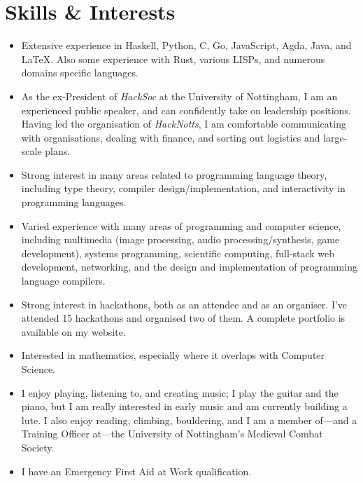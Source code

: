 \documentclass[12pt]{article}
\begin{document}
\section*{Skills \& Interests}
\begin{itemize}
	\item Extensive experience in Haskell, Python, C, Go, JavaScript, Agda, Java, and \LaTeX. Also some experience with Rust, various LISPs, and numerous domains specific languages.
	\item As the ex-President of \textit{HackSoc} at the University of Nottingham, I am an experienced public speaker, and can confidently take on leadership positions. Having led the organisation of \textit{HackNotts}, I am comfortable communicating with organisations, dealing with finance, and sorting out logistics and large-scale plans.
	\item Strong interest in many areas related to programming language theory, including type theory, compiler design/implementation, and interactivity in programming languages.
	\item Varied experience with many areas of programming and computer science, including multimedia (image processing, audio processing/synthesis, game development), systems programming, scientific computing, full-stack web development, networking, and the design and implementation of programming language compilers.
	\item Strong interest in hackathons, both as an attendee and as an organiser. I've attended 15 hackathons and organised two of them. A complete portfolio is available on my website.
	\item Interested in mathematics, especially where it overlaps with Computer Science.
	\item I enjoy playing, listening to, and creating music; I play the guitar and the piano, but I am really interested in early music and am currently building a lute. I also enjoy reading, climbing, bouldering, and I am a member of---and a Training Officer at---the University of Nottingham's Medieval Combat Society.
	\item I have an Emergency First Aid at Work qualification.
\end{itemize}
\end{document}
